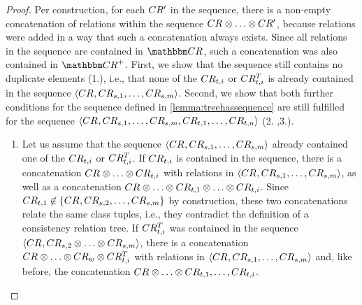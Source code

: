 \begin{proof}
    Per construction, for each $CR'_{}$ in the sequence, there is a non-empty concatenation of relations within the sequence $\consistencyrelation{CR}{} \concat \dots \concat \consistencyrelation{CR'}{}$, because relations were added in a way that such a concatenation always exists. Since all relations in the sequence are contained in $\consistencyrelationset{CR}$, such a concatenation was also contained in $\transitiveclosure{\consistencyrelationset{CR}}$.
    First, we show that the sequence still contains no duplicate elements (1.), i.e., that none of the $CR_{t,i}$ or $CR^T_{t,i}$ is already contained in the sequence $\langle CR_{}, CR_{s,1}, \dots, CR_{s,m} \rangle$. 
    Second, we show that both further conditions for the sequence defined in \autoref{lemma:treehassequence} are still fulfilled for the sequence $\langle CR_{}, CR_{s,1}, \dots, CR_{s,m}, CR_{t,1}, \dots, CR_{t,n} \rangle$ (2. ,3.).
    \begin{enumerate}
        \item
    Let us assume that the sequence $\langle CR_{}, CR_{s,1}, \dots, CR_{s,m} \rangle$ already contained one of the $CR_{t,i}$ or $CR^T_{t,i}$. If $CR_{t,i}$ is contained in the sequence, there is a concatenation $\consistencyrelation{CR}{} \concat \dots \concat \consistencyrelation{CR}{t,i}$ with relations in $\langle CR_{}, CR_{s,1}, \dots, CR_{s,m} \rangle$, as well as a concatenation $\consistencyrelation{CR}{} \concat \dots \concat \consistencyrelation{CR}{t,1} \concat \dots \concat \consistencyrelation{CR}{t,i}$.
    Since $CR_{t,1} \not\in \{ CR_{}, CR_{s,2}, \dots, CR_{s,m} \}$ by construction, these two concatenations relate the same class tuples, i.e., they contradict the definition of a consistency relation tree.
    If $CR^T_{t,i}$ was contained in the sequence $\tupled{\consistencyrelation{CR}{}, \consistencyrelation{CR}{s,2} \concat \dots \concat \consistencyrelation{CR}{s,m}}$, there is a concatenation $\consistencyrelation{CR}{} \concat \dots \concat \consistencyrelation{CR}{w} \concat \consistencyrelation{CR^T}{t,i}$ with relations in $\langle CR_{}, CR_{s,1}, \dots, CR_{s,m} \rangle$ and, like before, the concatenation $\consistencyrelation{CR}{} \concat \dots \concat \consistencyrelation{CR}{t,1}, \dots, \consistencyrelation{CR}{t,i}$.

\end{enumerate}
\end{proof}
